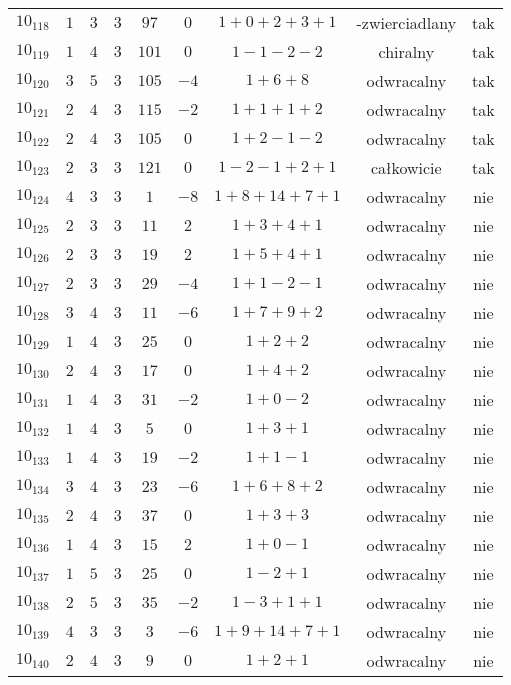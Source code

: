 \begin{longtable}{ccccccccc}
$10_{118}$ & $1$ & $3$ & $3$ & $97$ & $0$ & $1+0+2+3+1$ & -zwierciadlany & tak \\
$10_{119}$ & $1$ & $4$ & $3$ & $101$ & $0$ & $1-1-2-2$ & chiralny & tak \\
$10_{120}$ & $3$ & $5$ & $3$ & $105$ & $-4$ & $1+6+8$ & odwracalny & tak \\
$10_{121}$ & $2$ & $4$ & $3$ & $115$ & $-2$ & $1+1+1+2$ & odwracalny & tak \\
$10_{122}$ & $2$ & $4$ & $3$ & $105$ & $0$ & $1+2-1-2$ & odwracalny & tak \\
$10_{123}$ & $2$ & $3$ & $3$ & $121$ & $0$ & $1-2-1+2+1$ & całkowicie & tak \\
$10_{124}$ & $4$ & $3$ & $3$ & $1$ & $-8$ & $1+8+14+7+1$ & odwracalny & nie \\
$10_{125}$ & $2$ & $3$ & $3$ & $11$ & $2$ & $1+3+4+1$ & odwracalny & nie \\
$10_{126}$ & $2$ & $3$ & $3$ & $19$ & $2$ & $1+5+4+1$ & odwracalny & nie \\
$10_{127}$ & $2$ & $3$ & $3$ & $29$ & $-4$ & $1+1-2-1$ & odwracalny & nie \\
$10_{128}$ & $3$ & $4$ & $3$ & $11$ & $-6$ & $1+7+9+2$ & odwracalny & nie \\
$10_{129}$ & $1$ & $4$ & $3$ & $25$ & $0$ & $1+2+2$ & odwracalny & nie \\
$10_{130}$ & $2$ & $4$ & $3$ & $17$ & $0$ & $1+4+2$ & odwracalny & nie \\
$10_{131}$ & $1$ & $4$ & $3$ & $31$ & $-2$ & $1+0-2$ & odwracalny & nie \\
$10_{132}$ & $1$ & $4$ & $3$ & $5$ & $0$ & $1+3+1$ & odwracalny & nie \\
$10_{133}$ & $1$ & $4$ & $3$ & $19$ & $-2$ & $1+1-1$ & odwracalny & nie \\
$10_{134}$ & $3$ & $4$ & $3$ & $23$ & $-6$ & $1+6+8+2$ & odwracalny & nie \\
$10_{135}$ & $2$ & $4$ & $3$ & $37$ & $0$ & $1+3+3$ & odwracalny & nie \\
$10_{136}$ & $1$ & $4$ & $3$ & $15$ & $2$ & $1+0-1$ & odwracalny & nie \\
$10_{137}$ & $1$ & $5$ & $3$ & $25$ & $0$ & $1-2+1$ & odwracalny & nie \\
$10_{138}$ & $2$ & $5$ & $3$ & $35$ & $-2$ & $1-3+1+1$ & odwracalny & nie \\
$10_{139}$ & $4$ & $3$ & $3$ & $3$ & $-6$ & $1+9+14+7+1$ & odwracalny & nie \\
$10_{140}$ & $2$ & $4$ & $3$ & $9$ & $0$ & $1+2+1$ & odwracalny & nie \\

\end{longtable}
